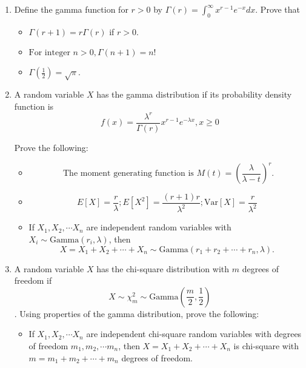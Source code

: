 \documentclass[12pt]{article}
\begin{document}
\begin{enumerate}


\item Define the gamma function for $r > 0$ by $\Gamma(r) = \int_0^{\infty}x^{r-1}e^{-x}dx.$ Prove that


\begin{itemize}
\item $\Gamma(r+1) = r\Gamma(r)$ if $r >0.$
\vspace{120pt}
\item $\text {For integer } n > 0,  \Gamma(n+1) = n!$
\vspace{120pt}
\item $\Gamma(\frac{1}{2}) = \sqrt{\pi}.$
\vspace{120pt}



\end{itemize}

\pagebreak

\item A random variable $X$ has the gamma distribution if its probability density function is $$f(x) = \frac{\lambda^r}{\Gamma(r)}x^{r-1}e^{-\lambda x}, x \geq 0$$

Prove the following:
\begin{itemize}
\item $$\text{ The moment generating function is }M(t) = (\frac{\lambda}{\lambda-t})^r.$$
\vspace{100pt}
\item $$E[X] = \frac{r}{\lambda}; E[X^2] =  \frac{(r+1)r}{\lambda^2}; \text{Var}[X] = \frac{r}{\lambda^2}$$
\vspace{120pt}

\item If $X_1, X_2, \cdots X_n$ are independent random variables with $X_i \sim \text{Gamma}(r_i, \lambda)$, then $$X = X_1 + X_2 + \cdots + X_n \sim \text{Gamma}(r_1 + r_2 + \cdots + r_n, \lambda).$$
\end{itemize}

\pagebreak

\item A random variable $X$  has the chi-square distribution with $m$ degrees of freedom if $$X \sim \chi^2_m \sim  \text{Gamma}(\frac{m}{2}, \frac{1}{2})$$.
Using properties of the gamma distribution, prove the following:
\begin{itemize}
\item If $X_1, X_2, \cdots X_n$ are independent chi-square random variables with degrees of freedom $m_1, m_2, \cdots m_n$, then $X = X_1 + X_2 + \cdots + X_n$ is chi-square with $m = m_1+ m_2 + \cdots + m_n$ degrees of freedom.
\vspace{80pt}


\end{itemize}
\end{enumerate}
\end{document}
